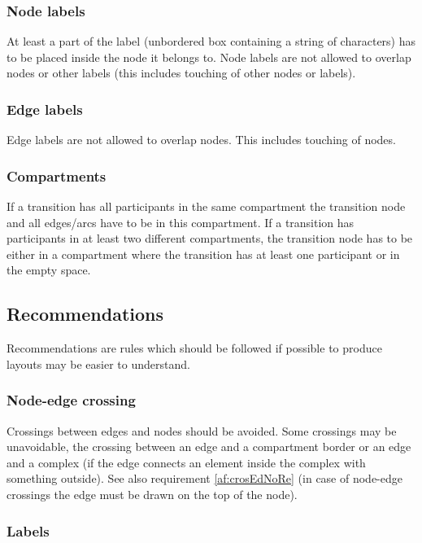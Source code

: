 \subsubsection{Node labels}

At least a part of the label (unbordered box containing a string of
characters) has to be placed inside the node it belongs to. Node
labels are not allowed to overlap nodes or other labels (this
includes touching of other nodes or labels).

\subsubsection{Edge labels}

Edge labels are not allowed to overlap nodes. This includes touching
of nodes.

\subsubsection{Compartments}

If a transition has all participants in the same compartment the
transition node and all edges/arcs have to be in this compartment.
If a transition has participants in at least two different
compartments, the transition node has to be either in a compartment
where the transition has at least one participant or in the empty
space.

\subsection{Recommendations}

Recommendations are rules which should be followed if possible to
produce layouts may be easier to understand.

\subsubsection{Node-edge crossing}
\label{af:crosEdNo}

Crossings between edges and nodes should be avoided. Some crossings
may be unavoidable, \eg the crossing between an edge and a
compartment border or an edge and a complex (if the edge connects an
element inside the complex with something outside). See also
requirement \ref{af:crosEdNoRe} (in case of node-edge crossings the
edge must be drawn on the top of the node).

\subsubsection{Labels}

